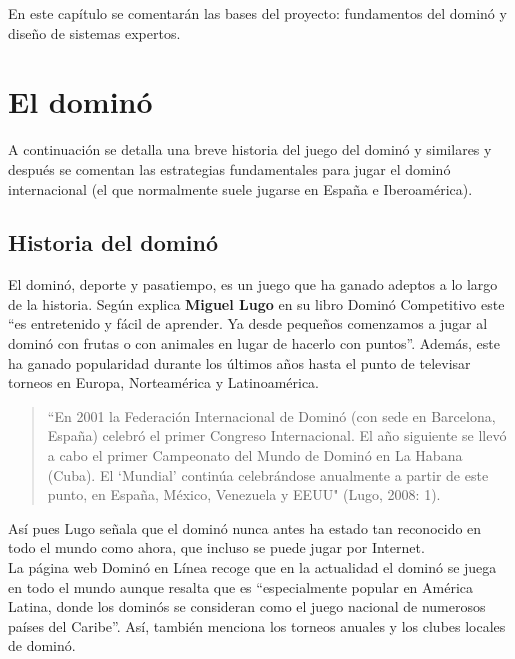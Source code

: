 

En este capítulo se comentarán las bases del proyecto: fundamentos del dominó y diseño de sistemas expertos.

\section{El dominó}

A continuación se detalla una breve historia del juego del dominó y similares y después se comentan las estrategias fundamentales para jugar el dominó internacional (el que normalmente suele jugarse en España e Iberoamérica).

\subsection{Historia del dominó}

El dominó, deporte y pasatiempo, es un juego que ha ganado adeptos a lo largo de la historia. Según explica \textbf{Miguel Lugo} en su libro Dominó Competitivo \cite{lugo08} este “es entretenido y fácil de
aprender. Ya desde pequeños comenzamos a jugar al dominó con frutas o con animales en lugar de hacerlo
con puntos”. Además, este ha ganado popularidad durante los últimos años hasta el punto de televisar
torneos en Europa, Norteamérica y Latinoamérica.

\begin{quote}
“En 2001 la Federación Internacional de Dominó (con sede en Barcelona, España) celebró el primer
Congreso Internacional. El año siguiente se llevó a cabo el primer Campeonato del Mundo de Dominó en La
Habana (Cuba). El ‘Mundial’ continúa celebrándose anualmente a partir de este punto, en España, México,
Venezuela y EEUU" (Lugo, 2008: 1).
\end{quote}

Así pues Lugo señala que el dominó nunca antes ha estado tan reconocido en todo el mundo como ahora, que
incluso se puede jugar por Internet. \\

La página web Dominó en Línea \cite{website:dominoenlinea} recoge que en la actualidad el dominó se juega en todo el
mundo aunque resalta que es “especialmente popular en América Latina, donde los dominós se consideran
como el juego nacional de numerosos países del Caribe”. Así, también menciona los torneos anuales y
los clubes locales de dominó.

